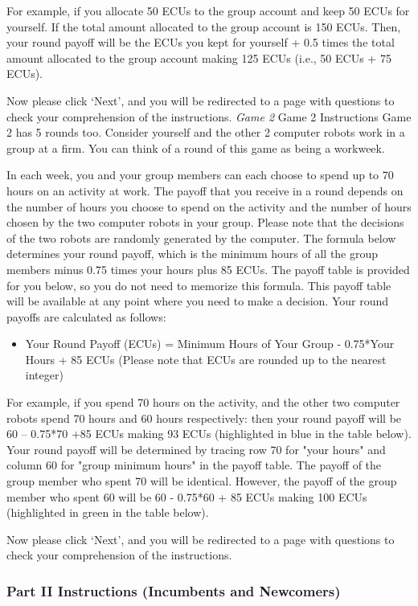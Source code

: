 For example, if you allocate 50 ECUs to the group account and keep 50 ECUs for yourself. If the total amount allocated to the group account is 150 ECUs. Then, your round payoff will be the ECUs you kept for yourself + 0.5 times the total amount allocated to the group account making 125 ECUs (i.e., 50 ECUs + 75 ECUs).

Now please click ‘Next’, and you will be redirected to a page with questions to check your comprehension of the instructions.
\textit{Game 2}
Game 2 Instructions
Game 2 has 5 rounds too. Consider yourself and the other 2 computer robots work in a group at a firm. You can think of a round of this game as being a workweek.

In each week, you and your group members can each choose to spend up to 70 hours on an activity at work. The payoff that you receive in a round depends on the number of hours you choose to spend on the activity and the number of hours chosen by the two computer robots in your group. Please note that the decisions of the two robots are randomly generated by the computer. The formula below determines your round payoff, which is the minimum hours of all the group members minus 0.75 times your hours plus 85 ECUs. The payoff table is provided for you below, so you do not need to memorize this formula. This payoff table will be available at any point where you need to make a decision. Your round payoffs are calculated as follows:
\begin{itemize}
    \item Your Round Payoff (ECUs) = Minimum Hours of Your Group - 0.75*Your Hours + 85 ECUs (Please note that ECUs are rounded up to the nearest integer)
\end{itemize}

For example, if you spend 70 hours on the activity, and the other two computer robots spend 70 hours and 60 hours respectively: then your round payoff will be 60 – 0.75*70 +85 ECUs making 93 ECUs (highlighted in blue in the table below). Your round payoff will be determined by tracing row 70 for "your hours" and column 60 for "group minimum hours" in the payoff table. The payoff of the group member who spent 70 will be identical. However, the payoff of the group member who spent 60 will be 60 - 0.75*60 + 85 ECUs making 100 ECUs (highlighted in green in the table below).

Now please click ‘Next’, and you will be redirected to a page with questions to check your comprehension of the instructions.

\subsubsection{Part II Instructions (Incumbents and Newcomers)}
\newline

